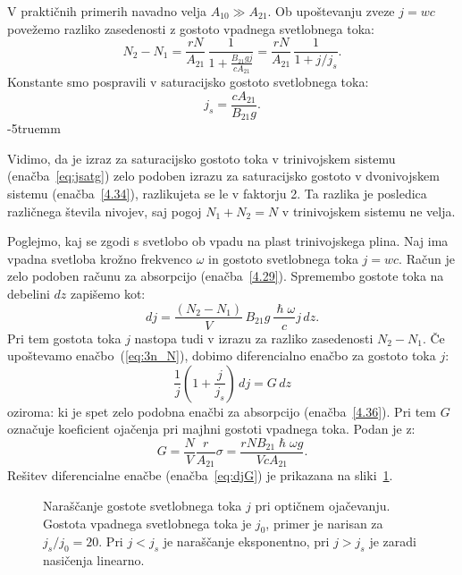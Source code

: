 V praktičnih primerih navadno velja $A_{10}\gg A_{21}$. Ob upoštevanju zveze $j=wc$ povežemo
razliko zasedenosti z gostoto vpadnega svetlobnega toka:
\begin{equation}
N_{2}-N_{1}=\frac{rN}{A_{21}} \, \frac{1}{1+\frac{B_{21}gj}{c A_{21}}} = 
\frac{rN}{A_{21}} \, \frac{1}{1+j/j_s}.
\label{eq:3n_N}
\end{equation}
Konstante smo pospravili v saturacijsko gostoto svetlobnega toka:
\begin{equation}
j_s = \frac{c A_{21}}{B_{21}g}.
\label{eq:jsatg}
\end{equation}
\vglue-5truemm
\begin{remark}
 Vidimo, da je  izraz za saturacijsko gostoto toka v trinivojskem sistemu 
 (enačba~\ref{eq:jsatg}) zelo podoben izrazu za saturacijsko gostoto v dvonivojskem
 sistemu (enačba~\ref{4.34}), razlikujeta se le
v faktorju 2. Ta razlika je posledica različnega števila nivojev, saj pogoj $N_{1}+N_{2}=N$
v trinivojskem sistemu ne velja. 
\end{remark}
Poglejmo, kaj se zgodi s svetlobo ob vpadu na plast trinivojskega plina. Naj ima vpadna
svetloba krožno frekvenco $\omega$ in gostoto svetlobnega toka $j=wc$. Račun je zelo podoben 
računu za absorpcijo (enačba~\ref{4.29}). 
Spremembo gostote toka na debelini $dz$ zapišemo kot: 
\begin{equation}
dj=\frac{(N_{2}-N_{1})}{V}\, B_{21}g\, \frac{\hslash\omega}{c}j\, dz.
\label{eq:dj}
\end{equation}
Pri tem gostota toka $j$ nastopa tudi v izrazu za razliko
zasedenosti $N_2-N_1$. Če upoštevamo enačbo~(\ref{eq:3n_N}), 
dobimo diferencialno enačbo za gostoto toka $j$:
\begin{equation}
\frac{1}{j}\left(1+\frac{j}{j_{s}}\right)\, dj=G\, dz
\label{4.43}
\end{equation}
oziroma:
ki je spet zelo podobna enačbi za absorpcijo (enačba~\ref{4.36}).
Pri tem $G$ označuje koeficient ojačenja pri majhni gostoti vpadnega
toka. Podan je z: 
\begin{equation}
G=\frac{N}{V}\frac{r}{A_{21}}\sigma=\frac{rNB_{21}\hslash\omega g}{VcA_{21}}.
\label{4.44}
\end{equation}
Rešitev diferencialne enačbe (enačba~\ref{eq:djG}) je prikazana na sliki~\ref{fig:ojacanje}. 
\begin{figure}[ht]
\centering
\def\svgwidth{80truemm} 

\caption{Naraščanje gostote svetlobnega toka $j$ pri optičnem ojačevanju. 
Gostota vpadnega svetlobnega toka je $j_0$, primer je narisan za $j_s/j_0 = 20$.
Pri $j<j_s$ je naraščanje eksponentno, 
pri $j>j_s$ je zaradi nasičenja linearno.
}
\label{fig:ojacanje}
\end{figure}

